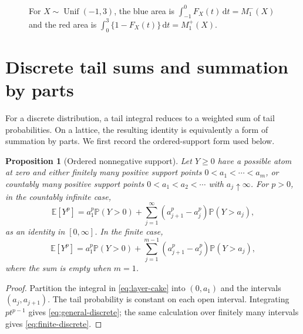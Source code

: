 \documentclass[11pt]{article}
\newtheorem{proposition}[theorem]{Proposition}
\theoremstyle{definition}
\theoremstyle{remark}
\newcommand{\E}{\mathbb{E}}
\newcommand{\Pp}{\mathbb{P}}
\newcommand{\dd}{\,\mathrm{d}}
\begin{document}
\begin{figure}[H]
\centering
{}
\caption{For $X\sim\operatorname{Unif}(-1,3)$, the blue area is
$\int_{-1}^{0}F_X(t)\dd t=M_1^-(X)$ and the red area is
$\int_0^3\{1-F_X(t)\}\dd t=M_1^+(X)$.}
\label{fig:uniform}
\end{figure}

\section{Discrete tail sums and summation by parts}
\label{sec:discrete}

For a discrete distribution, a tail integral reduces to a weighted sum of
tail probabilities.  On a lattice, the resulting identity is equivalently a
form of summation by parts.  We first record the ordered-support form used
below.

\begin{proposition}[Ordered nonnegative support]\label{prop:ordered-support}
Let $Y\geq0$ have a possible atom at zero and either finitely many positive
support points $0<a_1<\cdots<a_m$, or countably many positive support points
$0<a_1<a_2<\cdots$ with $a_j\uparrow\infty$.  For $p>0$, in the countably
infinite case,
\begin{equation}\label{eq:general-discrete}
  \E[Y^p]
  =a_1^p\Pp(Y>0)
   +\sum_{j=1}^\infty
    (a_{j+1}^p-a_j^p)\Pp(Y>a_j),
\end{equation}
as an identity in $[0,\infty]$.  In the finite case,
\begin{equation}\label{eq:finite-discrete}
  \E[Y^p]
  =a_1^p\Pp(Y>0)
   +\sum_{j=1}^{m-1}
    (a_{j+1}^p-a_j^p)\Pp(Y>a_j),
\end{equation}
where the sum is empty when $m=1$.
\end{proposition}

\begin{proof}
Partition the integral in \eqref{eq:layer-cake} into $(0,a_1)$ and the
intervals $(a_j,a_{j+1})$.  The tail probability is constant on each open
interval.  Integrating $p t^{p-1}$ gives \eqref{eq:general-discrete}; the
same calculation over finitely many intervals gives
\eqref{eq:finite-discrete}.
\end{proof}
\end{document}
